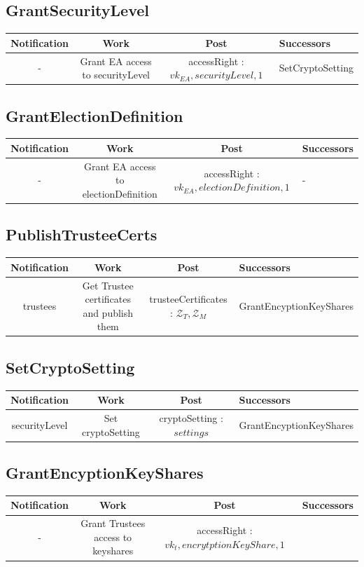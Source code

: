 \documentclass[bibtotoc,halfparskip,oneside]{scrreprt}
\begin{document}
\begin{landscape}
		\subsection{GrantSecurityLevel}
		\begin{tabularx}{\linewidth}{|c|c|c|X|}
			\hline Notification & Work & Post & Successors\\ 
			\hline - & Grant EA access to securityLevel & accessRight : $vk_{EA} , securityLevel, 1 $ & SetCryptoSetting \\ 
			\hline 
			\end{tabularx}
		
		\subsection{GrantElectionDefinition}
		\begin{tabularx}{\linewidth}{|c|c|c|X|}
			\hline Notification & Work & Post & Successors\\ 
			\hline - & Grant EA access to electionDefinition & accessRight : $vk_{EA} , electionDefinition, 1 $ & - \\ 
			\hline 
			\end{tabularx}
		
		\subsection{PublishTrusteeCerts}
		\begin{tabularx}{\linewidth}{|c|c|c|X|}
			\hline Notification & Work & Post & Successors\\ 
			\hline trustees & Get Trustee certificates and publish them & trusteeCertificates : $\mathcal{Z}_T , \mathcal{Z}_M$ & GrantEncyptionKeyShares \\ 
			\hline 
			\end{tabularx}
		
		\subsection{SetCryptoSetting}
		\begin{tabularx}{\linewidth}{|c|c|c|X|}
			\hline Notification & Work & Post & Successors\\  
			\hline securityLevel & Set cryptoSetting & cryptoSetting : $settings$  & GrantEncyptionKeyShares \\  
			\hline 
			\end{tabularx}
		
		\subsection{GrantEncyptionKeyShares}
		\begin{tabularx}{\linewidth}{|c|c|c|X|}
			\hline Notification & Work & Post & Successors\\  
			\hline  - & Grant Trustees access to keyshares & accessRight : $vk_t, encrytptionKeyShare , 1 $ &   \\ 
			\hline 
			\end{tabularx}
		

\end{landscape}
\end{document}
